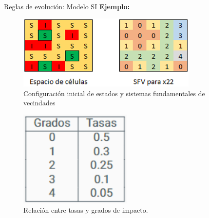 \documentclass[9pt]{beamer}
\begin{document}
\begin{frame}{Reglas de evolución: Modelo SI}
\textbf{Ejemplo:}

\begin{minipage}{0.55\textwidth}
\begin{figure}[h]
  \centering
    \includegraphics[width=0.8\textwidth]{Imagenes/cellSpacePresentation.png}
    \caption{Configuración inicial de estados y sistemas fundamentales de vecindades}
    \label{fig:configuraciónInicialEspacio25Celulas}
\end{figure}
\end{minipage}
\hfill
\begin{minipage}{0.4\textwidth}
\begin{figure}[h]
  \centering
    \includegraphics[width=0.5\textwidth]{Imagenes/RelacionTasasYGrados_Ex_SI.png}
    \caption{Relación entre tasas y grados de impacto.}
\end{figure}
\end{minipage}


\end{frame}
\end{document}

